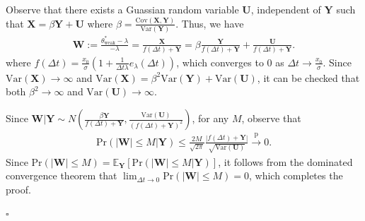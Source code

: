 \documentclass[final]{siamltex}
\begin{document}
\begin{appendices}
Observe that there exists a Guassian random variable $\bm{U}$, independent of $\bm{Y}$ such that $\bm{X} = \beta \bm{Y} + \bm{U}$
where $\beta = \frac{\text{Cov}(\bm{X},\bm{Y})}{\text{Var}(\bm{Y})}$.
Thus, we have
\begin{align*}
    \bm{W}:=\frac{\theta^*_\text{weak} - \lambda}{-\lambda}
    =  \frac{\bm{X}}{f(\Delta t) + \bm{Y}}
    =\beta \frac{\bm{Y}}{f(\Delta t) + \bm{Y}}
    + \frac{\bm{U}}{f(\Delta t)+ \bm{Y}}.
\end{align*}
where $f(\Delta t)= \frac{x_0}{\sigma}(1 +  \frac{1}{\Delta t \lambda}e_\lambda(\Delta t))$, which converges to 0 as $\Delta t \to \frac{x_0}{\sigma}$.
Since $\text{Var}(\bm{X}) \to \infty$ and $\text{Var}(\bm{X}) = \beta^2 \text{Var}(\bm{Y}) + \text{Var}(\bm{U})$, it can be checked that both $\beta^2 \to \infty$ and $\text{Var}(\bm{U}) \to \infty$.

Since $\bm{W}|\bm{Y}\sim N\left(\frac{\beta \bm{Y}}{f(\Delta t)+\bm{Y}}, \frac{\text{Var}(\bm{U})}{(f(\Delta t)+\bm{Y})^2}\right)$,
for any $M$, observe that 
\begin{align*}
    \text{Pr}\left( |\bm{W}| \le M | \bm{Y}\right) \le \frac{2M}{\sqrt{2\pi}}\frac{|f(\Delta t)+\bm{Y}|}{\sqrt{\text{Var}(\bm{U})}} \overset{\text{p}}{\to} 0.
\end{align*}
Since $\text{Pr}\left( |\bm{W}| \le M\right) = \mathbb{E}_{\bm{Y}}\left[\text{Pr}\left( |\bm{W}| \le M | \bm{Y}\right)\right]$, it follows from the dominated convergence theorem that 
$\lim_{\Delta t \to 0} \text{Pr}\left( |\bm{W}| \le M\right) = 0$, which completes the proof.

\hfill $\square$

    

\end{appendices}
\end{document}
